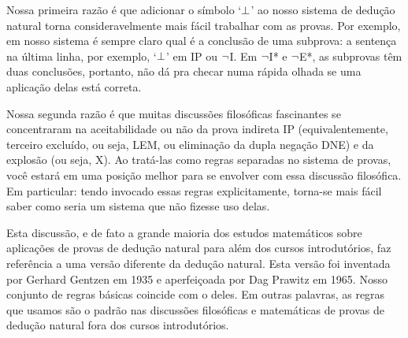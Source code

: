 Nossa primeira razão é que adicionar o símbolo `$\bot$' ao nosso sistema de dedução natural torna consideravelmente mais fácil trabalhar com as provas. Por exemplo, em nosso sistema é sempre claro qual é a conclusão de uma subprova: a sentença na última linha, por exemplo, `$\bot$' em IP ou $\neg$I. Em $\neg$I* e $\neg$E*, as subprovas têm duas conclusões, portanto, não dá pra checar numa rápida olhada se uma aplicação delas está correta.

Nossa segunda razão é que muitas discussões filosóficas fascinantes se concentraram na aceitabilidade ou não da prova indireta IP (equivalentemente, terceiro excluído, ou seja, LEM, ou eliminação da dupla negação DNE) e da explosão (ou seja, X). Ao tratá-las como regras separadas no sistema de provas, você estará em uma posição melhor para se envolver com essa discussão filosófica. Em particular: tendo invocado essas regras explicitamente, torna-se mais fácil saber como seria um sistema que não fizesse uso delas.

Esta discussão, e de fato a grande maioria dos estudos matemáticos sobre aplicações de provas de dedução natural para além dos cursos introdutórios, faz referência a uma versão diferente da dedução natural. Esta versão foi inventada por Gerhard Gentzen em 1935 e aperfeiçoada por Dag Prawitz em 1965. Nosso conjunto de regras básicas coincide com o deles. Em outras palavras, as regras que usamos são o padrão nas discussões filosóficas e matemáticas de provas de dedução natural fora dos cursos introdutórios. 


